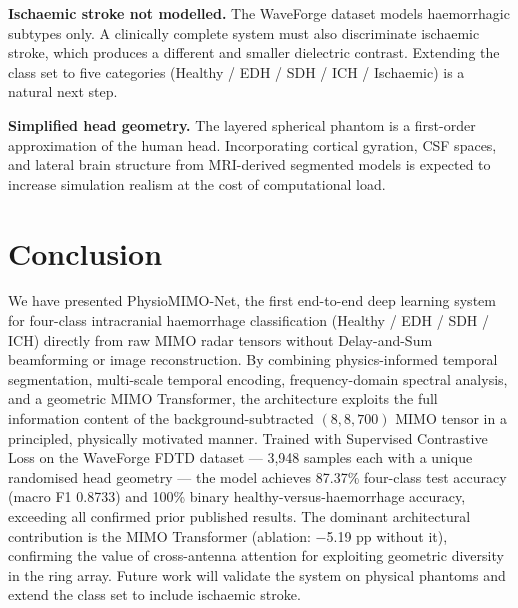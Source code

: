\documentclass[journal]{IEEEtran}
\begin{document}
\textbf{Ischaemic stroke not modelled.}  The WaveForge dataset
models haemorrhagic subtypes only.  A clinically complete
system must also discriminate ischaemic stroke, which
produces a different and smaller dielectric contrast.
Extending the class set to five categories
(Healthy / EDH / SDH / ICH / Ischaemic) is a natural next
step.

\textbf{Simplified head geometry.}  The layered spherical
phantom is a first-order approximation of the human head.
Incorporating cortical gyration, CSF spaces, and lateral
brain structure from MRI-derived segmented models is expected
to increase simulation realism at the cost of computational
load.


\section{Conclusion}
\label{sec:conclusion}

We have presented PhysioMIMO-Net, the first end-to-end deep
learning system for four-class intracranial haemorrhage
classification (Healthy / EDH / SDH / ICH) directly from raw
MIMO radar tensors without Delay-and-Sum beamforming or image
reconstruction.  By combining physics-informed temporal
segmentation, multi-scale temporal encoding, frequency-domain
spectral analysis, and a geometric MIMO Transformer, the
architecture exploits the full information content of the
background-subtracted $(8,8,700)$ MIMO tensor in a
principled, physically motivated manner.  Trained with
Supervised Contrastive Loss on the WaveForge FDTD dataset ---
3{,}948 samples each with a unique randomised head geometry ---
the model achieves 87.37\% four-class test accuracy
(macro F1 0.8733) and 100\% binary healthy-versus-haemorrhage
accuracy, exceeding all confirmed prior published results.
The dominant architectural contribution is the MIMO
Transformer (ablation: $-$5.19 pp without it), confirming
the value of cross-antenna attention for exploiting geometric
diversity in the ring array.  Future work will validate the
system on physical phantoms and extend the class set to
include ischaemic stroke.




\end{document}
